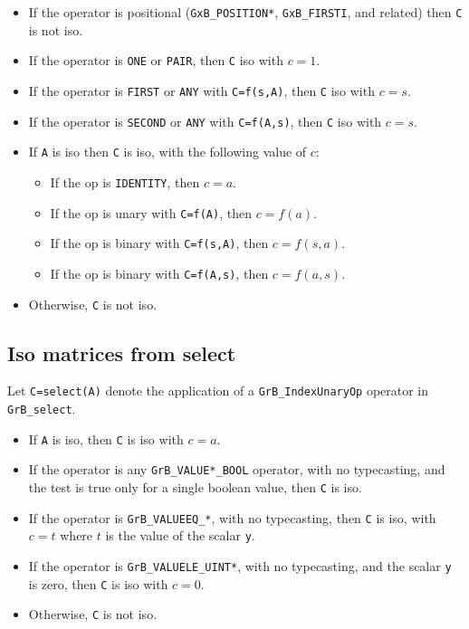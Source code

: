 \documentclass[12pt]{article}
\begin{document}
    \begin{itemize}
    \item If the operator is positional (\verb'GxB_POSITION*',
    \verb'GxB_FIRSTI', and related) then \verb'C' is not iso.

    \item If the operator is \verb'ONE' or \verb'PAIR',
        then \verb'C' iso with $c=1$.

    \item If the operator is \verb'FIRST' or \verb'ANY' with \verb'C=f(s,A)',
        then \verb'C' iso with $c=s$.

    \item If the operator is \verb'SECOND' or \verb'ANY' with \verb'C=f(A,s)',
        then \verb'C' iso with $c=s$.

    \item If \verb'A' is iso then \verb'C' is iso, with the following value
        of $c$:

        \begin{itemize}
        \item If the op is \verb'IDENTITY', then $c=a$.
        \item If the op is unary with \verb'C=f(A)', then $c=f(a)$.
        \item If the op is binary with \verb'C=f(s,A)', then $c=f(s,a)$.
        \item If the op is binary with \verb'C=f(A,s)', then $c=f(a,s)$.
        \end{itemize}


    \item Otherwise, \verb'C' is not iso.
    \end{itemize}

\subsection{Iso matrices from select}
\label{iso_select}

Let \verb'C=select(A)' denote the application of a \verb'GrB_IndexUnaryOp' operator
in \verb'GrB_select'.

    \begin{itemize}
    \item If \verb'A' is iso, then \verb'C' is iso with $c=a$.
    \item If the operator is any \verb'GrB_VALUE*_BOOL' operator,
        with no typecasting, and the test is true only for a single boolean
        value, then \verb'C' is iso.
    \item If the operator is \verb'GrB_VALUEEQ_*', with no typecasting,
        then \verb'C' is iso, with $c=t$ where $t$ is the value of the scalar
        \verb'y'.
    \item If the operator is \verb'GrB_VALUELE_UINT*', with no typecasting,
        and the scalar \verb'y' is zero, then \verb'C' is iso with $c=0$.
    \item Otherwise, \verb'C' is not iso.
    \end{itemize}
\end{document}
